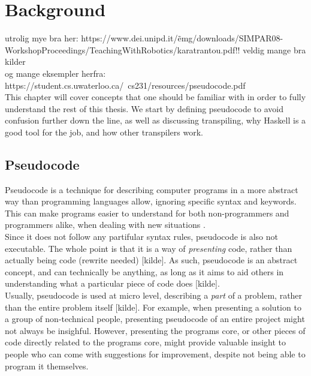\chapter{Background} %

utrolig mye bra her: https://www.dei.unipd.it/\~emg/downloads/SIMPAR08-WorkshopProceedings/TeachingWithRobotics/karatrantou.pdf!! veldig mange bra kilder \hfill \\

og mange eksempler herfra: https://student.cs.uwaterloo.ca/~cs231/resources/pseudocode.pdf \hfill \\

This chapter will cover concepts that one should be familiar with in order to fully understand the rest of this thesis. We start by defining pseudocode to avoid confusion further down the line, as well as discussing transpiling, why Haskell is a good tool for the job, and how other transpilers work.

\section{Pseudocode}

Pseudocode is a technique for describing computer programs in a more abstract way than programming languages allow, ignoring specific syntax and keywords. This can make programs easier to understand for both non-programmers and programmers alike, when dealing with new situations \cite{LinfoAlgorithmsIntro2007}. \hfill \\

Since it does not follow any partifular syntax rules, pseudocode is also not executable. The whole point is that it is a way of \textit{presenting} code, rather than actually being code (rewrite needed) [kilde]. As such, pseudocode is an abstract concept, and can technically be anything, as long as it aims to aid others in understanding what a particular piece of code does [kilde]. \hfill \\

Usually, pseudocode is used at micro level, describing a \textit{part} of a problem, rather than the entire problem itself [kilde]. For example, when presenting a solution to a group of non-technical people, presenting pseudocode of an entire project might not always be insighful. However, presenting the programs core, or other pieces of code directly related to the programs core, might provide valuable insight to people who can come with suggestions for improvement, despite not being able to program it themselves.
\hfill \\

